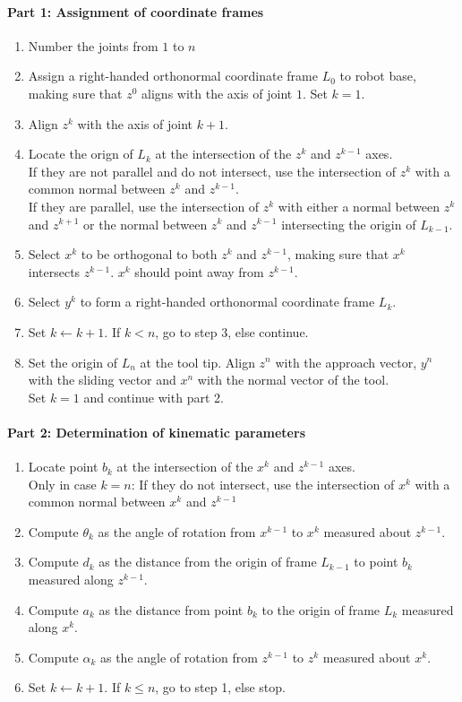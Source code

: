 \documentclass{article}
\begin{document}
	\paragraph{Part 1: Assignment of coordinate frames}
	\begin{enumerate}
		\item Number the joints from $1$ to $n$
		\item Assign a right-handed orthonormal coordinate frame $L_0$ to robot base, making sure that $z^0$ aligns with the axis of joint $1$. Set $k = 1$.
		\item Align $z^k$ with the axis of joint $k + 1$.
		\item Locate the orign of $L_k$ at the intersection of the $z^k$ and $z^{k-1}$ axes.\\
		If they are not parallel and do not intersect, use the intersection of $z^k$ with a common normal between $z^k$ and $z^{k-1}$.\\
		If they are parallel, use the intersection of $z^k$ with either a normal between $z^k$ and $z^{k+1}$ or the normal between $z^k$ and $z^{k-1}$ intersecting the origin of $L_{k-1}$.
		\item Select $x^k$ to be orthogonal to both $z^k$ and $z^{k-1}$, making sure that $x^k$ intersects $z^{k-1}$. $x^k$ should point away from $z^{k-1}$.
		\item Select $y^k$ to form a right-handed orthonormal coordinate frame $L_k$.
		\item Set $k \leftarrow k + 1$. If $k < n$, go to step 3, else continue.
		\item Set the origin of $L_n$ at the tool tip. Align $z^n$ with the approach vector, $y^n$ with the sliding vector and $x^n$ with the normal vector of the tool.\\
		Set $k = 1$ and continue with part 2.
	\end{enumerate}
	\paragraph{Part 2: Determination of kinematic parameters}
	\begin{enumerate}
		\item Locate point $b_k$ at the intersection of the $x^k$ and $z^{k-1}$ axes.\\
		Only in case $k = n$: If they do not intersect, use the intersection of $x^k$ with a common normal between $x^k$ and $z^{k-1}$
		\item Compute $\theta_{k}$ as the angle of rotation from $x^{k-1}$ to $x^k$ measured about $z^{k-1}$.
		\item Compute $d_k$ as the distance from the origin of frame $L_{k-1}$ to point $b_k$ measured along $z^{k-1}$.
		\item Compute $a_k$ as the distance from point $b_k$ to the origin of frame $L_k$ measured along $x^k$.
		\item Compute $\alpha_k$ as the angle of rotation from $z^{k-1}$ to $z^k$ measured about $x^k$.
		\item Set $k \leftarrow k + 1$. If $k \leq n$, go to step 1, else stop.
	\end{enumerate}
	
\end{document}
